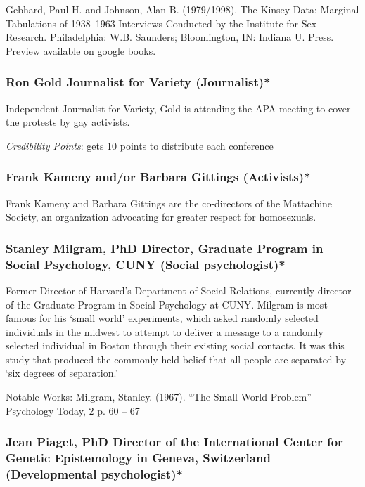 Gebhard, Paul H. and Johnson, Alan B. (1979\slash 1998). The Kinsey Data: Marginal Tabulations of 1938--1963 Interviews Conducted by the Institute for Sex Research. Philadelphia: W.B. Saunders; Bloomington, IN: Indiana U. Press. Preview available on google books.

\subsubsection{Ron Gold Journalist for Variety (Journalist)*}
\label{rongoldjournalistforvarietyjournalist}

Independent Journalist for Variety, Gold is attending the APA meeting to cover the protests by gay activists.

\emph{Credibility Points}: gets 10 points to distribute each conference

\subsubsection{Frank Kameny and\slash or Barbara Gittings (Activists)*}
\label{frankkamenyandorbarbaragittingsactivists}

Frank Kameny and Barbara Gittings are the co-directors of the Mattachine Society, an organization advocating for greater respect for homosexuals.

\subsubsection{Stanley Milgram, PhD Director, Graduate Program in Social Psychology, CUNY (Social psychologist)*}
\label{stanleymilgramphddirectorgraduateprograminsocialpsychologycunysocialpsychologist}

Former Director of Harvard's Department of Social Relations, currently director of the Graduate Program in Social Psychology at CUNY. Milgram is most famous for his `small world' experiments, which asked randomly selected individuals in the midwest to attempt to deliver a message to a randomly selected individual in Boston through their existing social contacts. It was this study that produced the commonly-held belief that all people are separated by `six degrees of separation.'

Notable Works:
Milgram, Stanley. (1967). ``The Small World Problem'' Psychology Today, 2 p. 60 – 67

\subsubsection{Jean Piaget, PhD Director of the International Center for Genetic Epistemology in Geneva, Switzerland (Developmental psychologist)*}
\label{jeanpiagetphddirectoroftheinternationalcenterforgeneticepistemologyingenevaswitzerlanddevelopmentalpsychologist}

